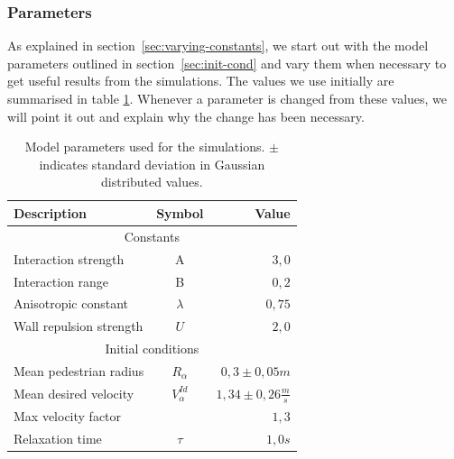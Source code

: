 \subsubsection{Parameters}
As explained in section~\ref{sec:varying-constants}, we start out with the 
model parameters outlined in section~\ref{sec:init-cond} and vary them when 
necessary to get useful results from the simulations.  The values we use 
initially are summarised in table \ref{tbl:parameter-settings}. Whenever a 
parameter is changed from these values, we will point it out and explain why 
the change has been necessary.

\begin{table}[ht]
    \begin{center}
        \begin{tabular}{l c r}
            \toprule
            \textbf{Description} & \textbf{Symbol} & \textbf{Value} \\
            \midrule
            \multicolumn{3}{c}{\textsf{Constants}}\\
            Interaction strength & A & $3,0$ \\
            Interaction range & B & $0,2$ \\
            Anisotropic constant & $\lambda$ & $0,75$ \\
            Wall repulsion strength & $U$ &  $2,0$ \\
            \midrule
            \multicolumn{3}{c}{\textsf{Initial conditions}}\\
            Mean pedestrian radius & $R_\alpha$ & $0,3 \pm 0,05 m$\\
            Mean desired velocity &  $V^{Id}_\alpha$ &  $1,34 \pm 0,26
            \frac{m}{s}$ \\
            Max velocity factor &  &  $1,3$ \\
            Relaxation time & $\tau$ & $1,0 s$\\
            \bottomrule
        \end{tabular}
        \caption[Model parameters]{Model parameters used for the simulations.  
        $\pm$ indicates standard deviation in Gaussian distributed values.}
        \label{tbl:parameter-settings}
    \end{center}
\end{table}

